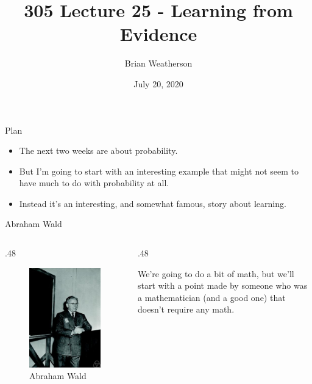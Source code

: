 \documentclass[
  ignorenonframetext,
]{beamer}
\title{305 Lecture 25 - Learning from Evidence}
\author{Brian Weatherson}
\date{July 20, 2020}
\providecommand{\tightlist}{%
  \setlength{\itemsep}{0pt}\setlength{\parskip}{0pt}}
\renewcommand{\,}{\text{, }}
\def\begincols{\begin{columns}}
\def\begincol{\begin{column}}
\def\endcol{\end{column}}
\def\endcols{\end{columns}}
\begin{document}
\frame{\titlepage}

\begin{frame}{Plan}
\protect\hypertarget{plan}{}

\begin{itemize}
\tightlist
\item
  The next two weeks are about probability.
\item
  But I'm going to start with an interesting example that might not seem
  to have much to do with probability at all.
\item
  Instead it's an interesting, and somewhat famous, story about
  learning.
\end{itemize}

\end{frame}

\begin{frame}{Abraham Wald}
\protect\hypertarget{abraham-wald}{}

\begincols
\begincol{.48\textwidth}

\begin{figure}
\centering
\includegraphics{../images/class10/wald_photo.jpg}
\caption{Abraham Wald}
\end{figure}

\endcol
\begincol{.48\textwidth}

We're going to do a bit of math, but we'll start with a point made by
someone who was a mathematician (and a good one) that doesn't require
any math.

\endcol
\endcols

\end{frame}
\end{document}
